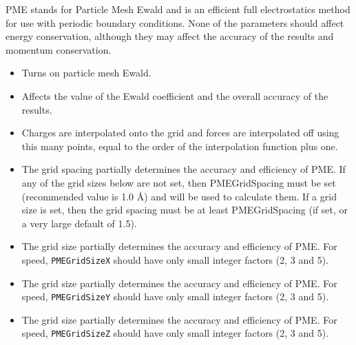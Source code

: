 PME stands for Particle Mesh Ewald and is an efficient
full electrostatics method for use with periodic boundary conditions.
None of the parameters should affect energy conservation, although they may affect the accuracy of the results and momentum conservation.

\begin{itemize}

\item
{}
{Turns on particle mesh Ewald.}

\item
{}
{Affects the value of the Ewald coefficient and the overall accuracy of the results.}

\item
{}
{Charges are interpolated onto the grid and forces are interpolated off using this many points, equal to the order of the interpolation function plus one.}

\item
{}
{The grid spacing partially determines the accuracy and efficiency of PME.
If any of the grid sizes below are not set, then PMEGridSpacing must be set
(recommended value is 1.0 \AA ) and will be used to calculate them.
If a grid size is set, then the grid spacing must be
at least PMEGridSpacing (if set, or a very large default of 1.5).}

\item
{}
{The grid size partially determines the accuracy and efficiency of PME.
For speed, {\tt PMEGridSizeX} should have only small integer factors (2, 3 and 5).}

\item
{}
{The grid size partially determines the accuracy and efficiency of PME.
For speed, {\tt PMEGridSizeY} should have only small integer factors (2, 3 and 5).}

\item
{}
{The grid size partially determines the accuracy and efficiency of PME.
For speed, {\tt PMEGridSizeZ} should have only small integer factors (2, 3 and 5).}


\end{itemize}
